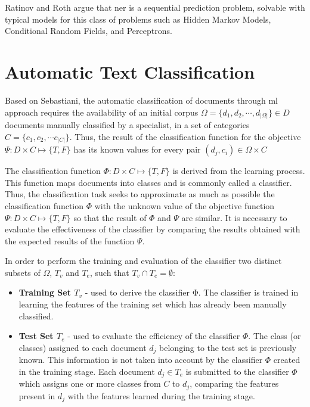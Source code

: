 Ratinov and Roth \cite{Ratinov:2009} argue that \gls{ner} is a sequential prediction problem, solvable with typical models for this class of problems such as Hidden Markov Models, Conditional Random Fields, and Perceptrons.



\section{\hspace*{3pt}Automatic Text Classification}

Based on Sebastiani\cite{Sebastiani:2002}, the automatic classification of documents through \gls{ml} approach requires the availability of an initial corpus  $\Omega=\{d_1,d_2, \cdots, d_{|\Omega|}\} \in D$ documents manually classified by a specialist, in a set of categories $C =\{c_1, c_2,\cdots c_{|C|}\}$. Thus, the result of the classification function for the objective $\Psi: D × C \mapsto \{T, F\}$ has its known values for every pair $(d_j, c_i) \in \Omega × C$

The classification function $\Phi: D × C \mapsto \{T, F\}$ is derived from the learning process. This function maps documents into classes and is commonly called a classifier. Thus, the classification task seeks to approximate as much as possible the classification function $\Phi$ with the unknown value of the objective function $\Psi: D × C \mapsto \{T, F\}$ so that the result of $\Phi$ and $\Psi$ are similar. It is necessary to evaluate the effectiveness of the classifier by comparing the results obtained with the expected results of the function $\Psi$.

In order to perform the training and evaluation of the classifier two distinct subsets of $\Omega$, $T_v$ and $T_e$, such that $T_v \cap T_e = \emptyset$:



\begin{itemize}
\item \textbf{Training Set $T_v$} - used to derive the classifier Φ. The classifier is trained in learning the features of the training set which has already been manually classified.


\item \textbf{Test Set $T_e$} - used to evaluate the efficiency of the classifier $\Phi$. The class (or classes) assigned to each document $d_j$ belonging to the test set is previously known. This information is not taken into account by the classifier $\Phi$ created in the training stage. Each document $d_j  \in T_e$  is submitted to the classifier $\Phi$ which assigns one or more classes from $C$ to $d_j$, comparing the features present in $d_j$ with the features learned during the training stage.
\end{itemize}



